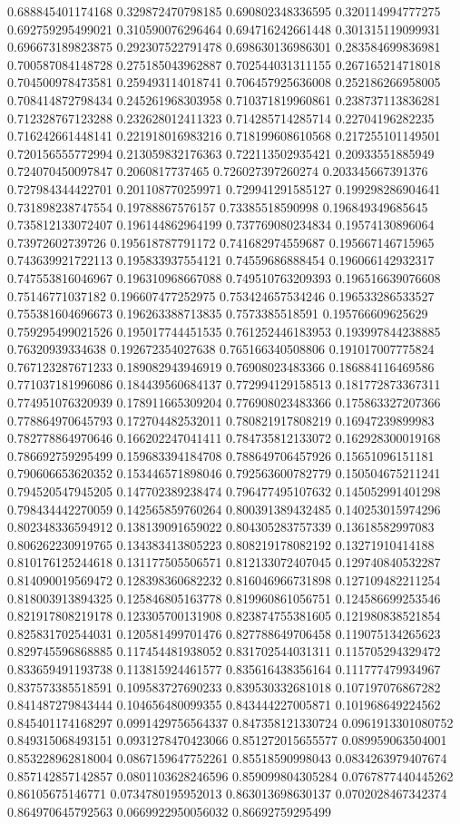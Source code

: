 \begin{table}
\begin{tabu}
\begin{sparkline}{10}
0.688845401174168 0.329872470798185 0.690802348336595 0.320114994777275 0.692759295499021 0.310590076296464 0.694716242661448 0.301315119099931 0.696673189823875 0.292307522791478 0.698630136986301 0.283584699836981 0.700587084148728 0.275185043962887 0.702544031311155 0.267165214718018 0.704500978473581 0.259493114018741 0.706457925636008 0.252186266958005 0.708414872798434 0.245261968303958 0.710371819960861 0.238737113836281 0.712328767123288 0.232628012411323 0.714285714285714 0.22704196282235 0.716242661448141 0.221918016983216 0.718199608610568 0.217255101149501 0.720156555772994 0.213059832176363 0.722113502935421 0.20933551885949 0.724070450097847 0.2060817737465 0.726027397260274 0.203345667391376 0.727984344422701 0.201108770259971 0.729941291585127 0.199298286904641 0.731898238747554 0.19788867576157 0.73385518590998 0.196849349685645 0.735812133072407 0.196144862964199 0.737769080234834 0.19574130896064 0.73972602739726 0.195618787791172 0.741682974559687 0.195667146715965 0.743639921722113 0.195833937554121 0.74559686888454 0.196066142932317 0.747553816046967 0.196310968667088 0.749510763209393 0.196516639076608 0.75146771037182 0.196607477252975 0.753424657534246 0.196533286533527 0.755381604696673 0.196263388713835 0.7573385518591 0.195766609625629 0.759295499021526 0.195017744451535 0.761252446183953 0.193997844238885 0.76320939334638 0.192672354027638 0.765166340508806 0.191017007775824 0.767123287671233 0.189082943946919 0.76908023483366 0.186884116469586 0.771037181996086 0.184439560684137 0.772994129158513 0.181772873367311 0.774951076320939 0.178911665309204 0.776908023483366 0.175863327207366 0.778864970645793 0.172704482532011 0.780821917808219 0.16947239899983 0.782778864970646 0.166202247041411 0.784735812133072 0.162928300019168 0.786692759295499 0.159683394184708 0.788649706457926 0.15651096151181 0.790606653620352 0.153446571898046 0.792563600782779 0.150504675211241 0.794520547945205 0.147702389238474 0.796477495107632 0.145052991401298 0.798434442270059 0.142565859760264 0.800391389432485 0.140253015974296 0.802348336594912 0.138139091659022 0.804305283757339 0.13618582997083 0.806262230919765 0.134383413805223 0.808219178082192 0.13271910414188 0.810176125244618 0.131177505506571 0.812133072407045 0.129740840532287 0.814090019569472 0.128398360682232 0.816046966731898 0.127109482211254 0.818003913894325 0.125846805163778 0.819960861056751 0.124586699253546 0.821917808219178 0.123305700131908 0.823874755381605 0.121980838521854 0.825831702544031 0.120581499701476 0.827788649706458 0.119075134265623 0.829745596868885 0.117454481938052 0.831702544031311 0.115705294329472 0.833659491193738 0.113815924461577 0.835616438356164 0.111777479934967 0.837573385518591 0.109583727690233 0.839530332681018 0.107197076867282 0.841487279843444 0.104656480099355 0.843444227005871 0.101968649224562 0.845401174168297 0.0991429756564337 0.847358121330724 0.0961913301080752 0.849315068493151 0.0931278470423066 0.851272015655577 0.089959063504001 0.853228962818004 0.0867159647752261 0.85518590998043 0.0834263979407674 0.857142857142857 0.0801103628246596 0.859099804305284 0.0767877440445262 0.86105675146771 0.0734780195952013 0.863013698630137 0.0702028467342374 0.864970645792563 0.0669922950056032 0.86692759295499 
\end{sparkline}
\end{tabu}
\end{table}
